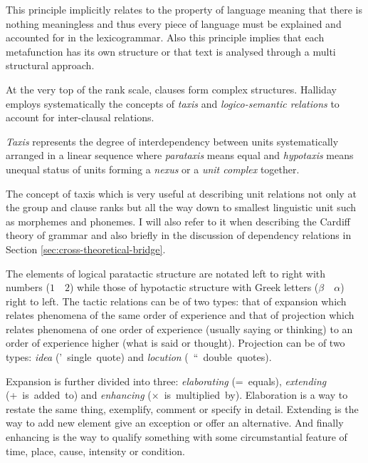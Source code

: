 This principle implicitly relates to the property of language meaning that 
there is nothing meaningless and thus every piece of language must be explained and accounted for in the lexicogrammar. Also this principle implies that each metafunction has its own structure or that text is analysed through a multi structural approach.

At the very top of the rank scale, clauses form complex structures. Halliday employs systematically the concepts of \textit{taxis} and \textit{logico-semantic relations} to account for inter-clausal relations. 

\begin{definition}[Taxis]\label{def:taxis}
    \textit{Taxis} represents the degree of interdependency between units systematically arranged in a linear sequence where \textit{parataxis} means equal and \textit{hypotaxis} means unequal status of units forming a \textit{nexus} or a \textit{unit complex} together.
\end{definition}

The concept of taxis which is very useful at describing unit relations not only at the group and clause ranks but all the way down to smallest linguistic unit such as morphemes and phonemes. I will also refer to it when describing the Cardiff theory of grammar and also briefly in the discussion of dependency relations in Section \ref{sec:cross-theoretical-bridge}.

The elements of logical paratactic structure are notated left to right with numbers ($1\quad2$) while those of hypotactic structure with Greek letters ($\beta\quad\alpha$) right to left. The tactic relations can be of two types: that of expansion which relates phenomena of the same order of experience and that of projection which relates phenomena of one order of experience (usually saying or thinking) to an order of experience higher (what is said or thought). Projection can be of two types: \textit{idea} \mbox{(' single quote)} and \textit{locution} \mbox{( `` double quotes)}.

Expansion is further divided into three: \textit{elaborating} \mbox{(= equals)}, \textit{extending} \mbox{(+ is added to)} and \textit{enhancing} \mbox{($\times$ is multiplied by)}. Elaboration is a way to restate the same thing, exemplify, comment or specify in detail. Extending is the way to add new element give an exception or offer an alternative. And finally enhancing is the way to qualify something with some circumstantial feature of time, place, cause, intensity or condition. 

